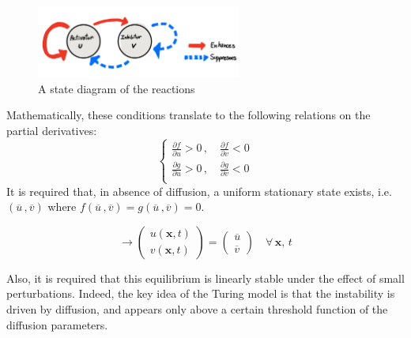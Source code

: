 \begin{figure}
	\centering
	\includegraphics[width = 0.6\textwidth]{images/diagram.jpeg}
	\caption{A state diagram of the reactions}
\end{figure}

Mathematically, these conditions translate to the following relations on the partial derivatives:
\begin{equation*}
    \begin{cases}
        \frac{\partial f}{\partial u} > 0 \,,\quad \frac{\partial f}{\partial v} < 0 \\
         \frac{\partial g}{\partial u} > 0 \,,\quad \frac{\partial g}{\partial v} < 0 \\       
    \end{cases}
\end{equation*}
It is required that, in absence of diffusion, a uniform stationary state exists, i.e.
$(\overline{u}\,, \overline{v})$
where $f(\overline{u}\,, \overline{v}) = g(\overline{u}\,, \overline{v})=0$. 

$$
\rightarrow
\begin{pmatrix}
  u(\mathbf{x}, t) \\
  v(\mathbf{x}, t) 
\end{pmatrix}
= 
\begin{pmatrix}
  \overline{u} \\
  \overline{v}
\end{pmatrix}
\quad \forall \, \mathbf{x},\, t
$$

Also, it is required that this equilibrium is linearly stable under the effect of small perturbations. Indeed, the key idea of the Turing model is that the instability is driven by diffusion, and appears only above a certain threshold function of the diffusion parameters. 


